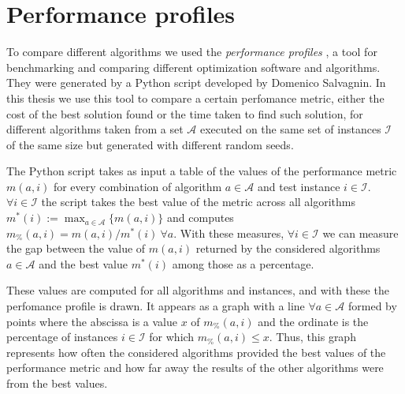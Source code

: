 \section{Performance profiles}

To compare different algorithms we used the \textit{performance profiles} \cite{Dolan2002}, a tool for benchmarking and comparing different optimization software and algorithms. They were generated by a Python script developed by Domenico Salvagnin. In this thesis we use this tool to compare a certain perfomance metric, either the cost of the best solution found or the time taken to find such solution, for different algorithms taken from a set $\mathcal{A}$ executed on the same set of instances $\mathcal{I}$ of the same size but generated with different random seeds.

The Python script takes as input a table of the values of the performance metric $m(a,i)$ for every combination of algorithm $a\in \mathcal{A}$ and test instance $i\in \mathcal{I}$. $\forall i\in \mathcal{I}$ the script takes the best value of the metric across all algorithms $m^*(i):=\max_{a\in\mathcal{A}}\{m(a,i)\}$ and computes $m_\%(a,i)=m(a,i)/m^*(i) \ \forall a$. With these measures, $\forall i\in \mathcal{I}$ we can measure the gap between the value of $m(a,i)$ returned by the considered algorithms $a\in\mathcal{A}$ and the best value $m^*(i)$ among those as a percentage.

These values are computed for all algorithms and instances, and with these the perfomance profile is drawn. It appears as a graph with a line $\forall a\in\mathcal{A}$ formed by points where the abscissa is a value $x$ of $m_\%(a,i)$ and the ordinate is the percentage of instances $i\in\mathcal{I}$ for which $m_\%(a,i)\leq x$. Thus, this graph represents how often the considered algorithms provided the best values of the performance metric and how far away the results of the other algorithms were from the best values.